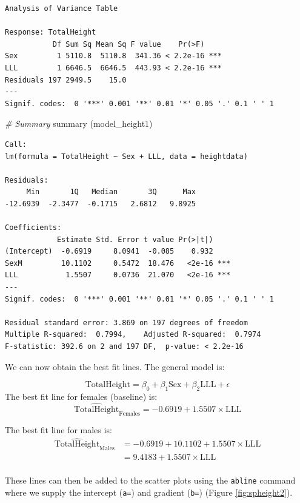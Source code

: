 \documentclass[
  oneside]{krantz}
\newenvironment{Shaded}{\begin{snugshade}}{\end{snugshade}}
\newcommand{\CommentTok}[1]{\textcolor[rgb]{0.56,0.35,0.01}{\textit{#1}}}
\newcommand{\FunctionTok}[1]{\textcolor[rgb]{0.00,0.00,0.00}{#1}}
\newcommand{\NormalTok}[1]{#1}
\begin{document}
\begin{verbatim}
Analysis of Variance Table

Response: TotalHeight
           Df Sum Sq Mean Sq F value    Pr(>F)    
Sex         1 5110.8  5110.8  341.36 < 2.2e-16 ***
LLL         1 6646.5  6646.5  443.93 < 2.2e-16 ***
Residuals 197 2949.5    15.0                      
---
Signif. codes:  0 '***' 0.001 '**' 0.01 '*' 0.05 '.' 0.1 ' ' 1
\end{verbatim}

\newpage

\begin{Shaded}
\begin{Highlighting}[]
\CommentTok{\# Summary}
\FunctionTok{summary}\NormalTok{ (model\_height1)}
\end{Highlighting}
\end{Shaded}

\begin{verbatim}
Call:
lm(formula = TotalHeight ~ Sex + LLL, data = heightdata)

Residuals:
     Min       1Q   Median       3Q      Max 
-12.6939  -2.3477  -0.1715   2.6812   9.8925 

Coefficients:
            Estimate Std. Error t value Pr(>|t|)    
(Intercept)  -0.6919     8.0941  -0.085    0.932    
SexM         10.1102     0.5472  18.476   <2e-16 ***
LLL           1.5507     0.0736  21.070   <2e-16 ***
---
Signif. codes:  0 '***' 0.001 '**' 0.01 '*' 0.05 '.' 0.1 ' ' 1

Residual standard error: 3.869 on 197 degrees of freedom
Multiple R-squared:  0.7994,    Adjusted R-squared:  0.7974 
F-statistic: 392.6 on 2 and 197 DF,  p-value: < 2.2e-16
\end{verbatim}

We can now obtain the best fit lines. The general model is:

\[\mathrm{TotalHeight} = \beta_0 + \beta_1\mathrm{Sex} + \beta_2\mathrm{LLL} + \epsilon\]
The best fit line for females (baseline) is:
\[\mathrm{\widehat{TotalHeight}_{Females}} = -0.6919 + 1.5507 \times \mathrm{LLL}\]

The best fit line for males is:
\begin{align}
\mathrm{\widehat{TotalHeight}_{Males}}& = -0.6919+ 10.1102 + 1.5507 \times \mathrm{LLL}\\
& = 9.4183 + 1.5507 \times \mathrm{LLL}\\
\end{align}

These lines can then be added to the scatter plots using the \texttt{abline} command where we supply the intercept (\texttt{a=}) and gradient (\texttt{b=}) (Figure \ref{fig:spheight2}).
\end{document}
